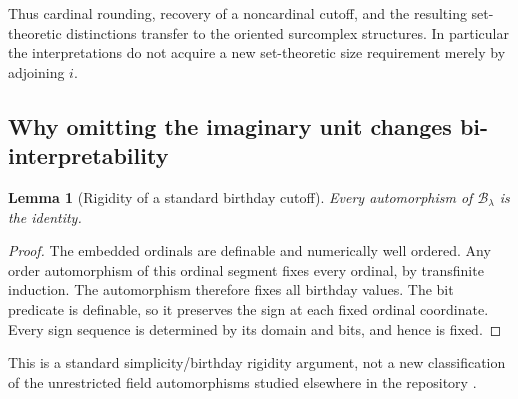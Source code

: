 \documentclass[11pt,letterpaper]{article}
\newtheorem{lemma}[theorem]{Lemma}
\theoremstyle{definition}
\theoremstyle{remark}
\newcommand{\B}{\mathcal B}
\begin{document}
Thus cardinal rounding, recovery of a noncardinal cutoff, and the resulting
set-theoretic distinctions transfer to the oriented surcomplex structures.
In particular the interpretations do not acquire a new set-theoretic
size requirement merely by adjoining $i$.

\subsection{Why omitting the imaginary unit changes bi-interpretability}

\begin{lemma}[Rigidity of a standard birthday cutoff]
\label{lem:rigidity}
Every automorphism of $\B_\lambda$ is the identity.
\end{lemma}
\begin{proof}
The embedded ordinals are definable and numerically well ordered. Any
order automorphism of this ordinal segment fixes every ordinal, by
transfinite induction. The automorphism therefore fixes all birthday
values. The bit predicate is definable, so it preserves the sign at each
fixed ordinal coordinate. Every sign sequence is determined by its domain
and bits, and hence is fixed.
\end{proof}

This is a standard simplicity/birthday rigidity argument, not a new
classification of the unrestricted field automorphisms studied elsewhere
in the repository \cite{RepoAutomorphisms}.
\end{document}
